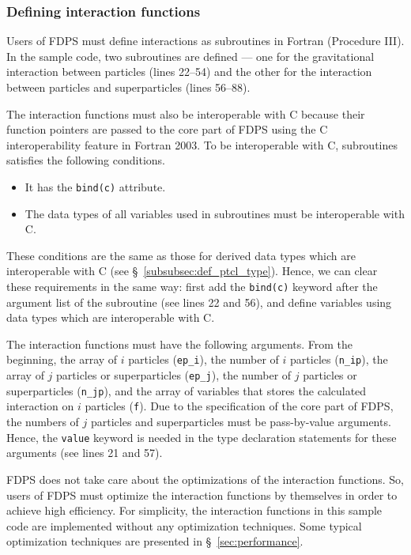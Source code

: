 \documentclass[twocolumn,useamsfonts]{pasj01}
\begin{document}
\subsubsection{Defining interaction functions}
\label{subsubsec:def_interact_func}
Users of FDPS must define interactions as subroutines in Fortran (Procedure III). In the sample code, two subroutines are defined --- one for the gravitational interaction between particles (lines 22--54) and the other for the interaction between particles and superparticles (lines 56--88).

The interaction functions must also be interoperable with C because their function pointers are passed to the core part of FDPS using the C interoperability feature in Fortran 2003. To be interoperable with C, subroutines satisfies the following conditions.
\begin{itemize}
\item It has the \texttt{bind(c)} attribute.
\item The data types of all variables used in subroutines must be interoperable with C.
\end{itemize}
These conditions are the same as those for derived data types which are interoperable with C (see \S~\ref{subsubsec:def_ptcl_type}). Hence, we can clear these requirements in the same way: first add the \texttt{bind(c)} keyword after the argument list of the subroutine (see lines 22 and 56), and define variables using data types which are interoperable with C.

The interaction functions must have the following arguments. From the beginning, the array of $i$ particles (\texttt{ep\_i}), the number of $i$ particles (\texttt{n\_ip}), the array of $j$ particles or superparticles (\texttt{ep\_j}), the number of $j$ particles or superparticles (\texttt{n\_jp}), and the array of variables that stores the calculated interaction on $i$ particles (\texttt{f}). Due to the specification of the core part of FDPS, the numbers of $j$ particles and superparticles must be pass-by-value arguments. Hence, the \texttt{value} keyword is needed in the type declaration statements for these arguments (see lines 21 and 57).

FDPS does not take care about the optimizations of the interaction functions. So, users of FDPS must optimize the interaction functions by themselves in order to achieve high efficiency. For simplicity, the interaction functions in this sample code are implemented without any optimization techniques. Some typical optimization techniques are presented in \S~\ref{sec:performance}.
\end{document}
